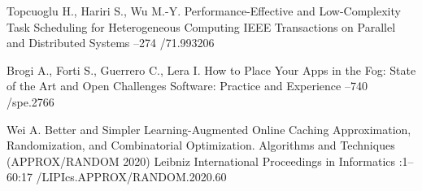 \by Topcuoglu H., Hariri S., Wu M.-Y.
\paper Performance-Effective and Low-Complexity Task Scheduling for Heterogeneous Computing
\jour IEEE Transactions on Parallel and Distributed Systems
--274
/71.993206

\by Brogi A., Forti S., Guerrero C., Lera I.
\paper How to Place Your Apps in the Fog: State of the Art and Open Challenges
\jour Software: Practice and Experience
--740
/spe.2766

\by Wei A.
\paper Better and Simpler Learning-Augmented Online Caching
\inbook Approximation, Randomization, and Combinatorial Optimization. Algorithms and Techniques (APPROX/RANDOM 2020)
\serial Leibniz International Proceedings in Informatics
:1--60:17
/LIPIcs.APPROX/RANDOM.2020.60

